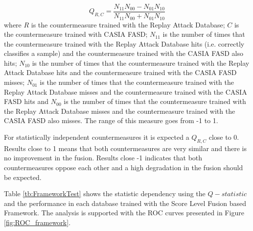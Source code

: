 \begin{equation}
\label{eq:Qstatistic}
Q_{R,C} = \frac{N_{11}N_{00} - N_{01}N_{10}}{N_{11}N_{00} +N_{01}N_{10}}
\end{equation}
where $R$ is the countermeasure trained with the Replay Attack Database; $C$ is the countermeasure trained with CASIA FASD; $N_{11}$ is the number of times that the countermeasure trained with the Replay Attack Database hits (i.e. correctly classifies a sample) and the countermeasure trained with the CASIA FASD also hits; $N_{10}$ is the number of times that the countermeasure trained with the Replay Attack Database hits and the countermeasure trained with the CASIA FASD misses; $N_{01}$ is the number of times that the countermeasure trained with the Replay Attack Database misses and the countermeasure trained with the CASIA FASD hits and $N_{00}$ is the number of times that the countermeasure trained with the Replay Attack Database misses and the countermeasure trained with the CASIA FASD also misses. The range of this measure goes from -1 to 1.

For statistically independent countermeasures it is expected a $Q_{R,C}$ close to 0. Results close to 1 means that both countermeasures are very similar and there is no improvement in the fusion. Results close -1 indicates that both countermeasures oppose each other and a high degradation in the fusion should be expected. 

Table \ref{tb:FrameworkTest} shows the statistic dependency using the $Q-statistic$ and the performance in each database trained with the Score Level Fusion based Framework. The analysis is supported with the ROC curves presented in Figure \ref{fig:ROC_framework}.

